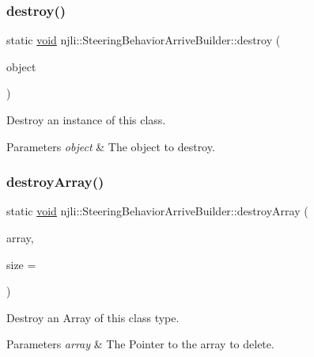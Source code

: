 \subsubsection{\texorpdfstring{destroy()}{destroy()}}
{\footnotesize\ttfamily static \mbox{\hyperlink{_thread_8h_af1e856da2e658414cb2456cb6f7ebc66}{void}} njli\+::\+Steering\+Behavior\+Arrive\+Builder\+::destroy (\begin{DoxyParamCaption}\item[{\mbox{\hyperlink{classnjli_1_1_steering_behavior_arrive_builder}{Steering\+Behavior\+Arrive\+Builder}} $\ast$}]{object }\end{DoxyParamCaption})\hspace{0.3cm}{\ttfamily [static]}}

Destroy an instance of this class.


\begin{DoxyParams}{Parameters}
{\em object} & The object to destroy. \\
\hline
\end{DoxyParams}
\mbox{\label{classnjli_1_1_steering_behavior_arrive_builder_aeec33257b37c71fd3cb7042c534f1ff7}} 
\subsubsection{\texorpdfstring{destroy\+Array()}{destroyArray()}}
{\footnotesize\ttfamily static \mbox{\hyperlink{_thread_8h_af1e856da2e658414cb2456cb6f7ebc66}{void}} njli\+::\+Steering\+Behavior\+Arrive\+Builder\+::destroy\+Array (\begin{DoxyParamCaption}\item[{\mbox{\hyperlink{classnjli_1_1_steering_behavior_arrive_builder}{Steering\+Behavior\+Arrive\+Builder}} $\ast$$\ast$}]{array,  }\item[{const \mbox{\hyperlink{_util_8h_a10e94b422ef0c20dcdec20d31a1f5049}{u32}}}]{size = {} }\end{DoxyParamCaption})\hspace{0.3cm}{\ttfamily [static]}}

Destroy an Array of this class type.


\begin{DoxyParams}{Parameters}
{\em array} & The Pointer to the array to delete. \\
\hline
\end{DoxyParams}
\mbox{\label{classnjli_1_1_steering_behavior_arrive_builder_a4030f557718317373ffcb0a594a0b8d5}} 
